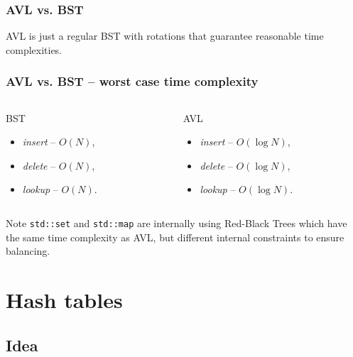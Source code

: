 \documentclass{beamer}
\begin{document}
\begin{frame}
    \frametitle{AVL vs. BST}
    AVL is just a regular BST with rotations that guarantee reasonable
    time complexities. \pause

    \centering
\end{frame}

\begin{frame}
    \frametitle{AVL vs. BST -- worst case time complexity}
    \begin{columns}
    \begin{column}{0.5\textwidth}
    \centering
    \begin{block}{BST}
    \begin{itemize}
        \item \textit{insert} -- $O(N)$,
        \item \textit{delete} -- $O(N)$,
        \item \textit{lookup} -- $O(N)$.
    \end{itemize}
    \end{block}
    \end{column}
    \pause
    \begin{column}{0.5\textwidth}
    \centering
    \begin{block}{AVL}
    \begin{itemize}
        \item \textit{insert} -- $O(\log N)$,
        \item \textit{delete} -- $O(\log N)$,
        \item \textit{lookup} -- $O(\log N)$.
    \end{itemize}
    \end{block}
    \end{column}
    \end{columns}

    \pause
    \begin{block}{Note}
        \texttt{std::set} and \texttt{std::map} are internally using
        Red-Black Trees which have the same time complexity as AVL, but different
        internal constraints to ensure balancing.
    \end{block}
\end{frame}

\section{Hash tables}

\subsection{Idea}
\end{document}
